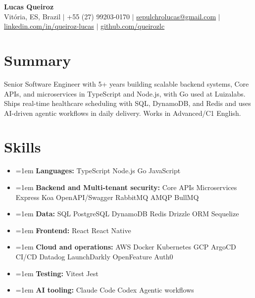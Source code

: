 \documentclass[letterpaper,10pt]{article}
\newcommand{\resumeItem}[1]{\item\small{\hangindent=1em\hangafter=1 #1}}
\newcommand{\resumeSubHeadingList}{\begin{itemize}[leftmargin=0.15in, label={}, nosep]}
\newcommand{\resumeSubHeadingListEnd}{\end{itemize}}
\begin{document}
\begin{center}
  \textbf{\Huge Lucas Queiroz} \\[3pt]
  \small Vit\'oria, ES, Brazil $|$ +55 (27) 99203-0170 $|$ \href{mailto:sepulchrolucas@gmail.com}{sepulchrolucas@gmail.com} $|$
  \href{https://linkedin.com/in/queiroz-lucas}{linkedin.com/in/queiroz-lucas} $|$
  \href{https://github.com/queirozlc}{github.com/queirozlc}
\end{center}
\vspace{2pt}

\section{Summary}
Senior Software Engineer with 5+ years building scalable backend systems, Core APIs, and microservices in TypeScript and Node.js, with Go used at Luizalabs. Ships real-time healthcare scheduling with SQL, DynamoDB, and Redis and uses AI-driven agentic workflows in daily delivery. Works in Advanced/C1 English.

\section{Skills}
\resumeSubHeadingList
\resumeItem{\textbf{Languages:} TypeScript \textbar{} Node.js \textbar{} Go \textbar{} JavaScript}
\resumeItem{\textbf{Backend and Multi-tenant security:} Core APIs \textbar{} Microservices \textbar{} Express \textbar{} Koa \textbar{} OpenAPI/Swagger \textbar{} RabbitMQ \textbar{} AMQP \textbar{} BullMQ}
\resumeItem{\textbf{Data:} SQL \textbar{} PostgreSQL \textbar{} DynamoDB \textbar{} Redis \textbar{} Drizzle ORM \textbar{} Sequelize}
\resumeItem{\textbf{Frontend:} React \textbar{} React Native}
\resumeItem{\textbf{Cloud and operations:} AWS \textbar{} Docker \textbar{} Kubernetes \textbar{} GCP \textbar{} ArgoCD \textbar{} CI/CD \textbar{} Datadog \textbar{} LaunchDarkly \textbar{} OpenFeature \textbar{} Auth0}
\resumeItem{\textbf{Testing:} Vitest \textbar{} Jest}
\resumeItem{\textbf{AI tooling:} Claude Code \textbar{} Codex \textbar{} Agentic workflows}
\resumeSubHeadingListEnd
\end{document}
